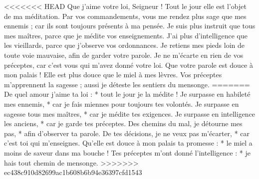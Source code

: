 <<<<<<< HEAD
Que j’aime votre loi, Seigneur ! Tout le jour elle est l’objet de ma méditation.
\versseparator
Par vos commandements, vous me rendez plus sage que mes ennemis ; car ils sont toujours présents à ma pensée.
\versseparator
Je suis plus instruit que tous mes maîtres, parce que je médite vos enseignements.
\versseparator
J’ai plus d’intelligence que les vieillards, parce que j’observe vos ordonnances.
\versseparator
Je retiens mes pieds loin de toute voie mauvaise, afin de garder votre parole.
\versseparator
Je ne m’écarte en rien de vos préceptes, car c’est vous qui m’avez donné votre loi.
\versseparator
Que votre parole est douce à mon palais ! Elle est plus douce que le miel à mes lèvres.
\versseparator
Vos préceptes m’apprennent la sagesse ; aussi je déteste les sentiers du mensonge.
=======
De quel amour j’aime ta loi : *
tout le jour je la médite !
\versseparator
Je surpasse en habileté mes ennemis, *
car je fais miennes pour toujours tes volontés.
\versseparator
Je surpasse en sagesse tous mes maîtres, *
car je médite tes exigences.
\versseparator
Je surpasse en intelligence les anciens, *
car je garde tes préceptes.
\versseparator
Des chemins du mal, je détourne mes pas, *
afin d’observer ta parole.
\versseparator
De tes décisions, je ne veux pas m’écarter, *
car c’est toi qui m’enseignes.
\versseparator
Qu’elle est douce à mon palais ta promesse : *
le miel a moins de saveur dans ma bouche !
\versseparator
Tes préceptes m’ont donné l’intelligence : *
je hais tout chemin de mensonge.
>>>>>>> ec438c910d82699ac1b608b6b94e36397cfd1543
